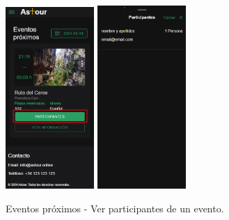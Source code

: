 \begin{figure}[H]
	\centering
	\includegraphics[width=0.3\textwidth]{7-Construccion/Manuales/mobile/participantes.png}
	\includegraphics[width=0.3\textwidth]{7-Construccion/Manuales/mobile/lista participantes.png}
	\caption{Eventos próximos - Ver participantes de un evento.}
\end{figure}

